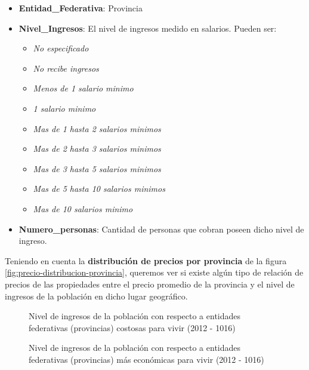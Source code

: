 \documentclass[
10pt, %
a4paper, %
oneside, %
headinclude,footinclude, %
BCOR5mm, %
]{scrartcl}
\begin{document}
\begin{itemize}

    \item \textbf{Entidad\_Federativa}: Provincia
    \item \textbf{Nivel\_Ingresos}: El nivel de ingresos medido en salarios. Pueden ser:
        \begin{itemize}
            \item \textit{No especificado}
            \item \textit{No recibe ingresos}
            \item \textit{Menos de 1 salario minimo}
            \item \textit{1 salario minimo}
            \item \textit{Mas de 1 hasta 2 salarios minimos}
            \item \textit{Mas de 2 hasta 3 salarios minimos}
            \item \textit{Mas de 3 hasta 5 salarios minimos}
            \item \textit{Mas de 5 hasta 10 salarios minimos}
            \item \textit{Mas de 10 salarios minimo}
        \end{itemize}
    \item \textbf{Numero\_personas}: Cantidad de personas que cobran poseen dicho nivel de ingreso.       
\end{itemize}

Teniendo en cuenta la \textbf{distribución de precios por provincia} de la figura \ref{fig:precio-distribucion-provincia}, queremos ver si existe algún tipo de relación de precios de las propiedades entre el precio promedio de la provincia y el nivel de ingresos de la población en dicho lugar geográfico.

    \begin{figure}[H]
        \caption{Nivel de ingresos de la población con respecto a entidades federativas (provincias) costosas para vivir (2012 - 1016)}
        \label{fig:nivel-ingresos-cara}
    \end{figure}


    \begin{figure}[H]
        \caption{Nivel de ingresos de la población con respecto a entidades federativas (provincias) más económicas para vivir (2012 - 1016)}
        \label{fig:nivel-ingresos-barata}
    \end{figure}
    
\end{document}
